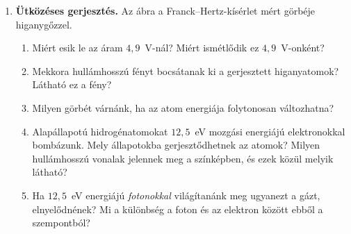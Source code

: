\documentclass[12pt]{article}
\begin{document}
\newpage
\begin{minipage}[t]{0.60\linewidth}\vspace{0pt}
\begin{enumerate}[start=5]
\item \textbf{Ütközéses gerjesztés.} Az ábra a Franck--Hertz-kísérlet mért görbéje
  higanygőzzel.
  \begin{enumerate}
    \item Miért esik le az áram $4{,}9$~V-nál? Miért ismétlődik ez $4{,}9$~V-onként?
    \item Mekkora hullámhosszú fényt bocsátanak ki a gerjesztett higanyatomok? Látható ez
      a fény?
    \item Milyen görbét várnánk, ha az atom energiája folytonosan változhatna?
    \item Alapállapotú hidrogénatomokat $12{,}5$~eV mozgási energiájú elektronokkal
      bombázunk. Mely állapotokba gerjesztődhetnek az atomok? Milyen hullámhosszú
      vonalak jelennek meg a színképben, és ezek közül melyik látható?
    \item Ha $12{,}5$~eV energiájú \emph{fotonokkal} világítanánk meg ugyanezt a gázt,
      elnyelődnének? Mi a különbség a foton és az elektron között ebből a
      szempontból?
  \end{enumerate}
\end{enumerate}
\end{minipage}\hfill
\begin{minipage}[t]{0.37\linewidth}\vspace{0pt}\centering
{}
\end{minipage}
\end{document}
